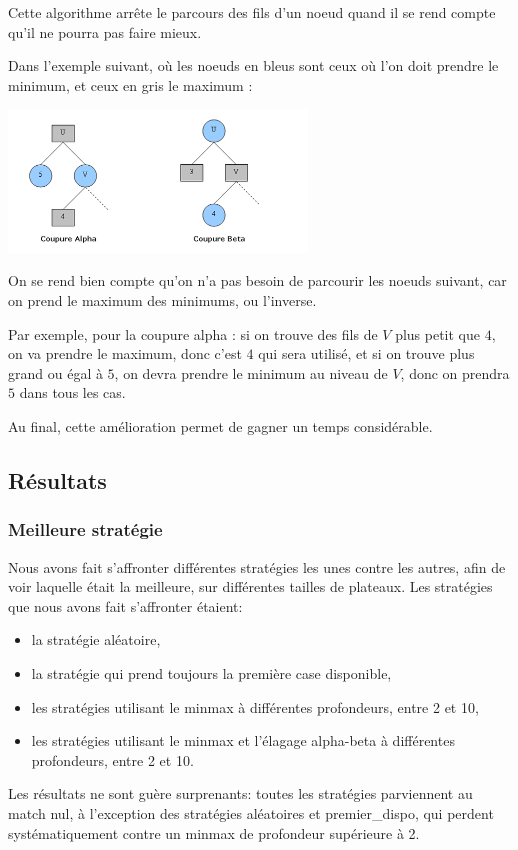 Cette algorithme arrête le parcours des fils d'un noeud quand il se rend
compte qu'il ne pourra pas faire mieux.

Dans l'exemple suivant, où les noeuds en bleus sont ceux où l'on doit prendre
le minimum, et ceux en gris le maximum :
\begin{center}
  \includegraphics[width=300px]{coupures_alpha-beta.png}
\end{center}

On se rend bien compte qu'on n'a pas besoin de parcourir les noeuds suivant,
car on prend le maximum des minimums, ou l'inverse.

Par exemple, pour la coupure alpha : si on trouve des fils de $V$ plus petit
que $4$, on va prendre le maximum, donc c'est $4$ qui sera utilisé, et si on
trouve plus grand ou égal à $5$, on devra prendre le minimum au niveau de $V$,
donc on prendra $5$ dans tous les cas.

Au final, cette amélioration permet de gagner un temps considérable.

\subsection{Résultats}
\subsubsection{Meilleure stratégie}
Nous avons fait s'affronter différentes stratégies les unes contre les
autres, afin de voir laquelle était la meilleure, sur différentes
tailles de plateaux. Les stratégies que nous avons fait s'affronter
étaient:
\begin{itemize}
  \item la stratégie aléatoire,
  \item la stratégie qui prend toujours la première case disponible,
  \item les stratégies utilisant le minmax à différentes profondeurs,
    entre 2 et 10,
  \item les stratégies utilisant le minmax et l'élagage alpha-beta à
    différentes profondeurs, entre 2 et 10.
\end{itemize}
Les résultats ne sont guère surprenants: toutes les stratégies
parviennent au match nul, à l'exception des stratégies aléatoires et
premier\_dispo, qui perdent systématiquement contre un minmax de
profondeur supérieure à 2.

